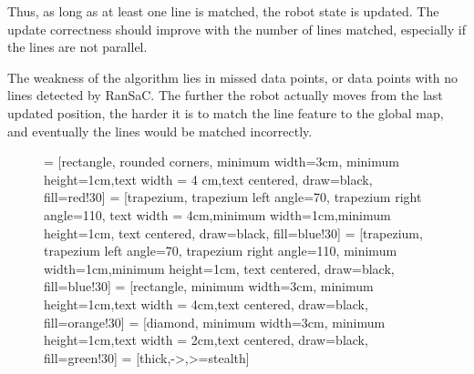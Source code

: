 Thus, as long as at least one line is matched, the robot state is updated.
The update correctness should improve with the number of lines matched,
especially if the lines are not parallel.

The weakness of the algorithm lies in missed data points, or data points with no lines detected by RanSaC.
The further the robot actually moves from the last updated position, the harder it is to match the line
feature to the global map, and eventually the lines would be matched incorrectly.

\begin{figure}
  \centering
     = [rectangle, rounded corners, minimum width=3cm, minimum height=1cm,text width = 4 cm,text centered, draw=black, fill=red!30]
     = [trapezium, trapezium left angle=70, trapezium right angle=110, text width = 4cm,minimum width=1cm,minimum height=1cm, text centered, draw=black, fill=blue!30]
     = [trapezium, trapezium left angle=70, trapezium right angle=110, minimum width=1cm,minimum height=1cm, text centered, draw=black, fill=blue!30]
     = [rectangle, minimum width=3cm, minimum height=1cm,text width = 4cm,text centered, draw=black, fill=orange!30]
     = [diamond, minimum width=3cm, minimum height=1cm,text width = 2cm,text centered, draw=black, fill=green!30]    
     = [thick,->,>=stealth]

\end{figure}
